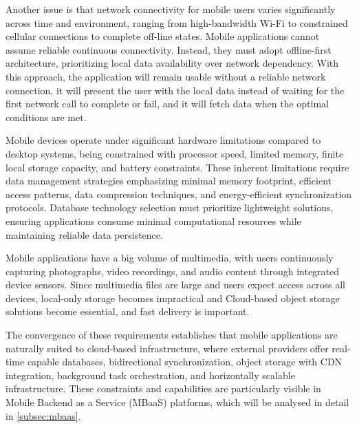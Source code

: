 Another issue is that network connectivity for mobile users varies significantly across time and environment, ranging from high-bandwidth Wi-Fi to constrained cellular connections to complete off-line states. Mobile applications cannot assume reliable continuous connectivity. Instead, they must adopt offline-first architecture, prioritizing local data availability over network dependency. With this approach, the application will remain usable without a reliable network connection, it will present the user with the local data instead of waiting for the first network call to complete or fail, and it will fetch data when the optimal conditions are met\cite{offlineFirst1}.

Mobile devices operate under significant hardware limitations compared to desktop systems, being constrained with processor speed, limited memory, finite local storage capacity, and battery constraints. These inherent limitations require data management strategies emphasizing minimal memory footprint, efficient access patterns, data compression techniques, and energy-efficient synchronization protocols. Database technology selection must prioritize lightweight solutions, ensuring applications consume minimal computational resources while maintaining reliable data persistence.\cite{offlineFirst1}

Mobile applications have a big volume of multimedia, with users continuously capturing  photographs, video recordings, and audio content through integrated device sensors. Since multimedia files are large and users expect access across all devices, local-only storage becomes impractical and Cloud-based object storage solutions become essential, and fast delivery is important.\cite{FERNANDO201384}

The convergence of these requirements establishes that mobile applications are naturally suited to cloud-based infrastructure, where external providers offer real-time capable databases, bidirectional synchronization, object storage with CDN integration, background task orchestration, and horizontally scalable infrastructure.\cite{offlineFirst1, FERNANDO201384} These constraints and capabilities are particularly visible in Mobile Backend as a Service (MBaaS) platforms, which will be analysed in detail in \ref{subsec:mbaas}.

